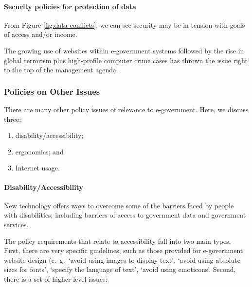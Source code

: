 \paragraph*{Security policies for protection of data}
From Figure \ref{fig:data-conflicts}, we can see security may be in tension with goals of access and/or income.

The growing use of websites within e-government systems followed by the rise in global terrorism plus high-profile computer crime cases has thrown the issue right to the top of the management agenda.


\subsubsection{Policies on Other Issues}

There are many other policy issues of relevance to e-government. Here, we discuss three:
\begin{multicols}{3}
	\begin{enumerate}
		\item disability/accessibility; 
		\item ergonomics; and 
		\item Internet usage.
	\end{enumerate}
\end{multicols}

 
\paragraph*{Disability/Accessibility}
New technology offers ways to overcome some of the barriers faced by people with disabilities; including barriers of access to government data and government services. 

The policy requirements that relate to accessibility fall into two main types. First, there are very specific guidelines, such as those provided for e-government website design (e.\ g.\ `avoid using images to display text', `avoid using absolute sizes for fonts', `specify the language of text', `avoid using emoticons'. Second, there is a set of higher-level issues:

